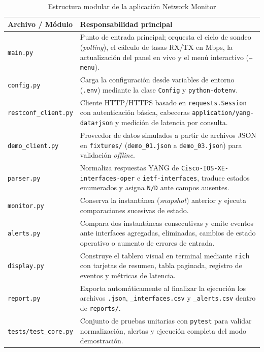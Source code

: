 \documentclass[12pt,a4paper]{article}
\begin{document}
\begin{table}[H]
    \centering
    \caption{Estructura modular de la aplicación Network Monitor}
    \label{tab:modulos_caso_uso}
    \begin{tabularx}{\textwidth}{p{}X}
        \toprule
        \textbf{Archivo / Módulo} & \textbf{Responsabilidad principal} \\
        \midrule
        \texttt{main.py} & Punto de entrada principal; orquesta el ciclo de sondeo (\textit{polling}), el cálculo de tasas RX/TX en Mbps, la actualización del panel en vivo y el menú interactivo (\texttt{--menu}). \\
        \texttt{config.py} & Carga la configuración desde variables de entorno (\texttt{.env}) mediante la clase \texttt{Config} y \texttt{python-dotenv}. \\
        \texttt{restconf\_client.py} & Cliente HTTP/HTTPS basado en \texttt{requests.Session} con autenticación básica, cabeceras \texttt{application/yang-data+json} y medición de latencia por consulta. \\
        \texttt{demo\_client.py} & Proveedor de datos simulados a partir de archivos JSON en \texttt{fixtures/} (\texttt{demo\_01.json} a \texttt{demo\_03.json}) para validación \textit{offline}. \\
        \texttt{parser.py} & Normaliza respuestas YANG de \texttt{Cisco-IOS-XE-interfaces-oper} e \texttt{ietf-interfaces}, traduce estados enumerados y asigna \texttt{N/D} ante campos ausentes. \\
        \texttt{monitor.py} & Conserva la instantánea (\textit{snapshot}) anterior y ejecuta comparaciones sucesivas de estado. \\
        \texttt{alerts.py} & Compara dos instantáneas consecutivas y emite eventos ante interfaces agregadas, eliminadas, cambios de estado operativo o aumento de errores de entrada. \\
        \texttt{display.py} & Construye el tablero visual en terminal mediante \texttt{rich} con tarjetas de resumen, tabla paginada, registro de eventos y métricas de latencia. \\
        \texttt{report.py} & Exporta automáticamente al finalizar la ejecución los archivos \texttt{.json}, \texttt{\_interfaces.csv} y \texttt{\_alerts.csv} dentro de \texttt{reports/}. \\
        \texttt{tests/test\_core.py} & Conjunto de pruebas unitarias con \texttt{pytest} para validar normalización, alertas y ejecución completa del modo demostración. \\
        \bottomrule
    \end{tabularx}
\end{table}
\end{document}
